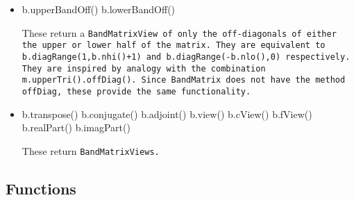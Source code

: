 \begin{itemize}
\item
\begin{tmvcode}
b.upperBandOff()
b.lowerBandOff()
\end{tmvcode}
These return a \tt{BandMatrixView} of only the off-diagonals of either the
upper or lower half of the matrix.  They are equivalent to
\tt{b.diagRange(1,b.nhi()+1)} and \tt{b.diagRange(-b.nlo(),0)} respectively.  
They are inspired by analogy with the combination \tt{m.upperTri().offDiag()}.
Since \tt{BandMatrix} does not have the method \tt{offDiag}, these provide
the same functionality.

\item
\begin{tmvcode}
b.transpose()
b.conjugate()
b.adjoint()
b.view()
b.cView()
b.fView()
b.realPart()
b.imagPart()
\end{tmvcode}
These return \tt{BandMatrixView}s.

\end{itemize}

\subsection{Functions}
\label{BandMatrix_Functions}

